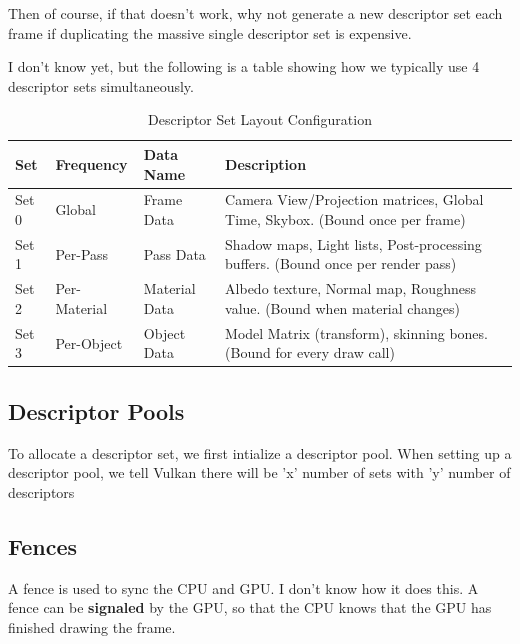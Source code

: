 \documentclass{article}
\begin{document}
\par Then of course, if that doesn't work, why
not generate a new descriptor set each frame if duplicating the
massive single descriptor set is expensive.

\par I don't know yet, but the following is a table showing how we
typically use 4 descriptor sets simultaneously.

\begin{table}[h]
  \centering
  \caption{Descriptor Set Layout Configuration}
  \label{tab:descriptor_sets}
  \begin{tabularx}{\textwidth}{@{}lllX@{}}
    \toprule
    \textbf{Set} & \textbf{Frequency} & \textbf{Data Name} &
    \textbf{Description} \\
    \midrule
    Set 0 & Global & Frame Data & Camera View/Projection matrices,
    Global Time, Skybox. (Bound once per frame) \\
    Set 1 & Per-Pass & Pass Data & Shadow maps, Light lists,
    Post-processing buffers. (Bound once per render pass) \\
    Set 2 & Per-Material & Material Data & Albedo texture, Normal
    map, Roughness value. (Bound when material changes) \\
    Set 3 & Per-Object & Object Data & Model Matrix (transform),
    skinning bones. (Bound for every draw call) \\
    \bottomrule
  \end{tabularx}
\end{table}

\subsection*{Descriptor Pools}
\par To allocate a descriptor set, we first intialize a descriptor
pool. When setting up a descriptor pool, we tell Vulkan there will be
'x' number of sets with 'y' number of descriptors

\subsection*{Fences}
\par A fence is used to sync the CPU and GPU. I don't know how it
does this. A fence can be \textbf{signaled} by the GPU, so that the
CPU knows that the GPU has finished drawing the frame.
\end{document}

